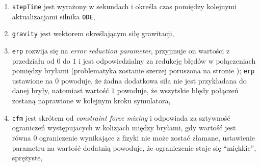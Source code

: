	\begin {enumerate}
	 \item \texttt{stepTime} jest wyrażony w sekundach i określa czas pomiędzy kolejnymi aktualizacjami silnika \texttt{ODE},
	 \item \texttt{gravity} jest wektorem określającym siłę grawitacji,
	 \item \texttt{erp} rozwija się na \textit{error reduction parameter}, przyjmuje on wartości z przedziału od $0$ do $1$ i jest odpowiedzialny za redukcję błędów w połączeniach pomiędzy bryłami
	  (problematyka zostanie szerzej poruszona na stronie \pageref{fig:joints}); \texttt{erp} ustawione na $0$ powoduje, że żadna dodatkowa siła nie jest przykładana do danej bryły, natomiast wartość $1$
	 powoduje, że wszytskie błędy połączeń zostaną naprawione w kolejnym kroku symulatora,
	 \item \texttt{cfm} jest skrótem od \textit{constraint force mixing} i odpowiada za sztywność ograniczeń występujacych w kolizjach między bryłami, gdy wartość jest równa $0$ ograniczenie wynikające z fizyki
nie może zostać złamane, ustawienie parametru na wartość dodatnią powoduje, że ograniczenie staje się ``miękkie'', sprężyste,
	  

\end{enumerate}
